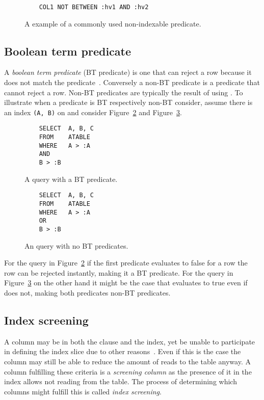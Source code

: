 \begin{figure}[ht]
  \begin{verbatim}
    COL1 NOT BETWEEN :hv1 AND :hv2
  \end{verbatim}
  \caption[An example of a non-indexable predicate]{A example of a commonly used
    non-indexable predicate.}\label{fig:sql:nonindexable}
\end{figure}

\subsection*{Boolean term predicate}
A \textit{boolean term predicate} (BT predicate) is one that can reject a row
because it does not match the
predicate~\cite{lahdenmaki_2005_relational_rdidatodossea}. Conversely a non-BT
predicate is a predicate that cannot reject a row. Non-BT predicates are
typically the result of using . To illustrate when a predicate is BT
respectively non-BT consider, assume there is an index \texttt{(A, B)} on
 and consider Figure~\ref{fig:sql:btpredicate} and
Figure~\ref{fig:sql:nonbtpredicate}.

\begin{figure}[ht]
  \begin{verbatim}
    SELECT  A, B, C
    FROM    ATABLE
    WHERE   A > :A
    AND
    B > :B
  \end{verbatim}
  \caption[A query containing a BT predicate]{A query with a BT
    predicate.}\label{fig:sql:btpredicate}
\end{figure}

\begin{figure}[ht]
  \begin{verbatim}
    SELECT  A, B, C
    FROM    ATABLE
    WHERE   A > :A
    OR
    B > :B
  \end{verbatim}
  \caption[A query containing no BT predicates]{An query with no BT
    predicates.}\label{fig:sql:nonbtpredicate}
\end{figure}

For the query in Figure~\ref{fig:sql:btpredicate} if the first predicate  evaluates to false for a row the row can be rejected instantly, making
it a BT predicate. For the query in Figure~\ref{fig:sql:nonbtpredicate} on the
other hand it might be the case that  evaluates to true even if
 does not, making both predicates non-BT predicates.

\subsection*{Index screening}
A column may be in both the  clause and the index, yet be unable to
participate in defining the index slice due to other
reasons~\cite{lahdenmaki_2005_relational_rdidatodossea}. Even if this is the
case the column may still be able to reduce the amount of reads to the table
anyway. A column fulfilling these criteria is a \textit{screening column} as the
presence of it in the index allows not reading from the table. The process of
determining which columns might fulfill this is called \textit{index screening}.

